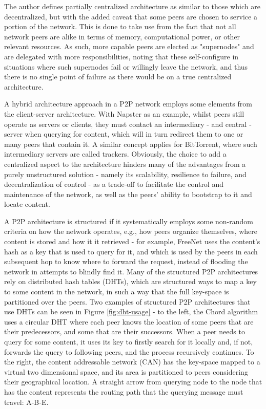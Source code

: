 \documentclass[
  oneside,
  11pt, a4paper,
  footinclude=true,
  headinclude=true,
  cleardoublepage=empty
]{scrbook}
\begin{document}
    The author defines partially centralized architecture as similar to those which are decentralized, but with the added caveat that some peers are chosen to service a portion of the network. This is done to take use from the fact that not all network peers are alike in terms of memory, computational power, or other relevant resources. As such, more capable peers are elected as "supernodes" and are delegated with more responsibilities, noting that these self-configure in situations where such supernodes fail or willingly leave the network, and thus there is no single point of failure as there would be on a true centralized architecture.
    
    A hybrid architecture approach in a P2P network  employs some elements from the client-server architecture. With Napster as an example, whilst peers still operate as servers or clients, they must contact an intermediary - and central - server when querying for content, which will in turn redirect them to one or many peers that contain it. A similar concept applies for BitTorrent, where such intermediary servers are called trackers. Obviously, the choice to add a centralized aspect to the architecture hinders many of the advantages from a purely unstructured solution - namely its scalability, resilience to failure, and decentralization of control - as a trade-off to facilitate the control and maintenance of the network, as well as the peers' ability to bootstrap to it and locate content.
    
    A P2P architecture is structured if it systematically employs some non-random criteria on how the network operates, e.g., how peers organize themselves, where content is stored and how it it retrieved - for example, FreeNet uses the content's hash as a key that is used to query for it, and which is used by the peers in each subsequent hop to know where to forward the request, instead of flooding the network in attempts to blindly find it. Many of the structured P2P architectures rely on distributed hash tables (DHTs), which are structured ways to map a key to some content in the network, in such a way that the full key-space is partitioned over the peers. Two examples of structured P2P architectures that use DHTs can be seen in Figure \ref{fig:dht-usage} - to the left, the Chord algorithm uses a circular DHT where each peer knows the location of some peers that are their predecessors, and some that are their successors. When a peer needs to query for some content, it uses its key to firstly search for it locally and, if not, forwards the query to following peers, and the process recursively continues. To the right, the content addressable network (CAN) has the key-space mapped to a virtual two dimensional space, and its area is partitioned to peers considering their geographical location. A straight arrow from querying node to the node that has the content represents the routing path that the querying message must travel: A-B-E.
    
\end{document}
